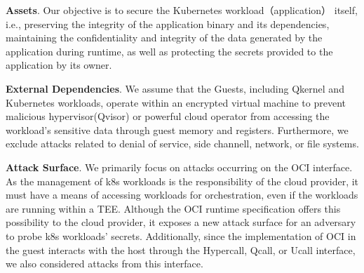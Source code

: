 \textbf{Assets}. Our objective is to secure the Kubernetes workload（application） itself, i.e., preserving the integrity of the application binary and its dependencies, maintaining the confidentiality and integrity of the data generated by the application during runtime, as well as protecting the secrets provided to the application by its owner.

\textbf{External Dependencies}. We assume that the Guests, including Qkernel and Kubernetes workloads, operate within an encrypted virtual machine to prevent malicious hypervisor(Qvisor) or powerful cloud operator from accessing the workload’s sensitive data through guest memory and registers. Furthermore, we exclude attacks related to denial of service\cite*{DOS_ATTACK}, side channell\cite*{217454}, 
network, or file systems.

\textbf{Attack Surface}. We primarily focus on attacks occurring on the OCI interface\cite*{oci-runtime-spec}. As the management of k8s workloads is the responsibility of the cloud provider, it must have a means of accessing workloads for orchestration, even if the workloads are running within a TEE. Although the OCI runtime specification offers this possibility to the cloud provider, 
it exposes a new attack surface for an adversary to probe k8s workloads’ secrets. Additionally, since the implementation of OCI in the guest interacts with the host through the Hypercall, Qcall, or Ucall interface, we also considered attacks from this interface.



\cleardoublepage

